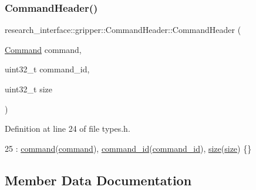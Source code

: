 \mbox{\label{structresearch__interface_1_1gripper_1_1CommandHeader_a3a80a487a2b98033a9af58625bd1ef90}} 
\subsubsection{\texorpdfstring{Command\+Header()}{CommandHeader()}\hspace{0.1cm}{\footnotesize\ttfamily [2/2]}}
{\footnotesize\ttfamily research\+\_\+interface\+::gripper\+::\+Command\+Header\+::\+Command\+Header (\begin{DoxyParamCaption}\item[{\hyperlink{namespaceresearch__interface_1_1gripper_adeda0327764e059bac8a5f967ce41590}{Command}}]{command,  }\item[{uint32\+\_\+t}]{command\+\_\+id,  }\item[{uint32\+\_\+t}]{size }\end{DoxyParamCaption})\hspace{0.3cm}{\ttfamily [inline]}}



Definition at line 24 of file types.\+h.


\begin{DoxyCode}
25       : \hyperlink{structresearch__interface_1_1gripper_1_1CommandHeader_a5a5591a722d3dbef5999b3a4af4e6cc2}{command}(\hyperlink{structresearch__interface_1_1gripper_1_1CommandHeader_a5a5591a722d3dbef5999b3a4af4e6cc2}{command}), \hyperlink{structresearch__interface_1_1gripper_1_1CommandHeader_aa1260b5ed470826d10c918e849dc98b7}{command\_id}(\hyperlink{structresearch__interface_1_1gripper_1_1CommandHeader_aa1260b5ed470826d10c918e849dc98b7}{command\_id}), 
      \hyperlink{structresearch__interface_1_1gripper_1_1CommandHeader_a0f7845a3260620f694f65982da4b6610}{size}(\hyperlink{structresearch__interface_1_1gripper_1_1CommandHeader_a0f7845a3260620f694f65982da4b6610}{size}) \{\}
\end{DoxyCode}


\subsection{Member Data Documentation}
\mbox{\label{structresearch__interface_1_1gripper_1_1CommandHeader_a5a5591a722d3dbef5999b3a4af4e6cc2}} 
